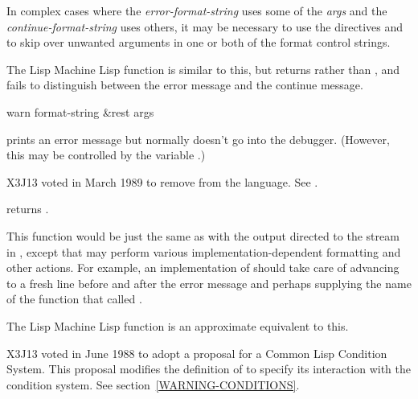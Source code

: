 \begin{defun}[Function]
In complex cases where the {\it error-format-string}
uses some of the {\it args} and the
{\it continue-format-string} uses others, it may be necessary to use the
 directives \cd{{\Xtilde}*} and \cd{{\Xtilde}{\Xatsign}*}
to skip over unwanted arguments in one or both of the
format control strings.

\beforenoterule
\begin{incompatibility}
The Lisp Machine Lisp function  is similar to this, but
returns 
rather than {\false}, and fails to distinguish between the error message
and the continue message.
\end{incompatibility}
\afternoterule
\end{defun}

\begin{defun}[Function]
warn format-string &rest args

\begin{obsolete}
\noindent
{} prints an error message but normally
doesn't go into the debugger.  (However, this may be controlled
by the variable .)
\end{obsolete}
\begin{newer}
X3J13 voted in March 1989
to remove  from the language.
See .
\end{newer}
\begin{obsolete}
 returns {\false}.

This function would be just the same as
 with the output directed 
to the stream in , except that 
may perform various implementation-dependent formatting and
other actions.  For example, an implementation of  should take
care of advancing to a fresh line before and after the error message
and perhaps supplying the name of the function that called .
\end{obsolete}

\beforenoterule
\begin{incompatibility}
The Lisp Machine Lisp function  is an
approximate equivalent to this.
\end{incompatibility}
\afternoterule

\begin{new}
X3J13 voted in June 1988
to adopt a proposal for a Common Lisp Condition System. 
This proposal modifies the definition of  to specify its interaction
with the condition system.  See section~\ref{WARNING-CONDITIONS}.
\end{new}
\end{defun}

